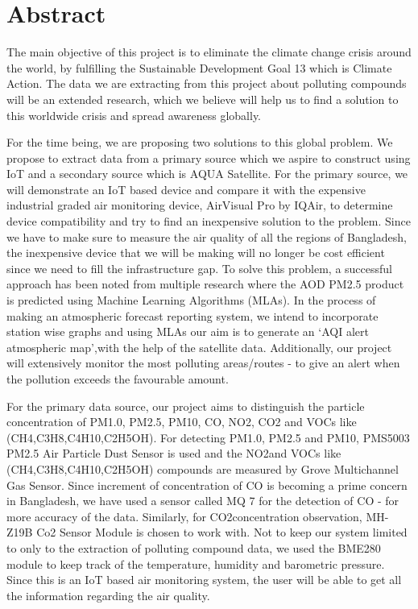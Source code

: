 \chapter*{\centering Abstract}

The main objective of this project is to eliminate the climate change crisis around the world, by fulfilling the Sustainable Development Goal 13 which is Climate Action. The data we are extracting from this project about polluting compounds will be an extended research, which we believe will help us to find a solution to this worldwide crisis and spread awareness globally. 

For the time being, we are proposing two solutions to this global problem. We propose to extract data from a primary source which we aspire to construct using IoT and a secondary source which is AQUA Satellite. For the primary source, we will demonstrate an IoT based device and compare it with the expensive industrial graded air monitoring device, AirVisual Pro by IQAir, to determine device compatibility and try to find an inexpensive solution to the problem. Since we have to make sure to measure the air quality of all the regions of Bangladesh, the inexpensive device that we will be making will no longer be cost efficient since we need to fill the infrastructure gap. To solve this problem, a successful approach has been noted from multiple research where the AOD PM2.5 product is predicted using Machine Learning Algorithms (MLAs). In the process of making an atmospheric forecast reporting system, we intend to incorporate station wise graphs and using MLAs our aim is to generate an ‘AQI alert atmospheric map’,with the help of the satellite data. Additionally, our project will extensively monitor the most polluting areas/routes - to give an alert when the pollution exceeds the favourable amount. 

For the primary data source, our project aims to distinguish the particle concentration of PM1.0, PM2.5, PM10, CO, NO2, CO2 and VOCs like (CH4,C3H8,C4H10,C2H5OH). For detecting PM1.0, PM2.5 and PM10, PMS5003 PM2.5 Air Particle Dust Sensor is used and the NO2and VOCs like (CH4,C3H8,C4H10,C2H5OH) compounds are measured by Grove Multichannel Gas Sensor. Since increment of concentration of CO is becoming a prime concern in Bangladesh, we have used a sensor called MQ 7 for the detection of CO -  for more accuracy of the data. Similarly, for CO2concentration observation, MH-Z19B Co2 Sensor Module is chosen to work with. Not to keep our system limited to only to the extraction of polluting compound data, we used the BME280 module to keep track of the temperature, humidity and barometric pressure. Since this is an IoT based air monitoring system, the user will be able to get all the information regarding the air quality.

